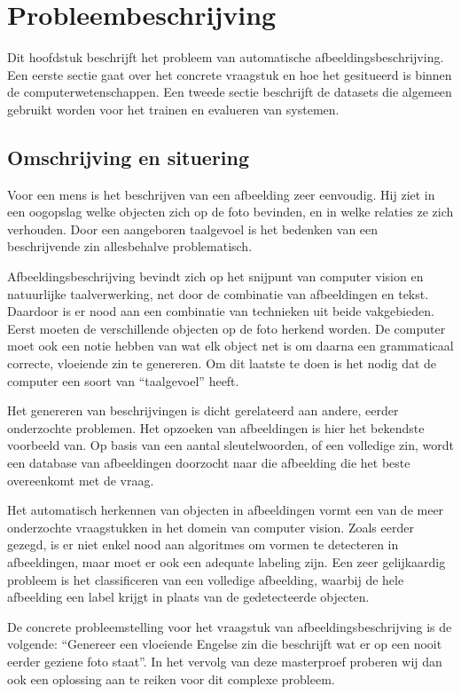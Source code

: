 \chapter{Probleembeschrijving}
\label{chap:Probleembeschrijving}

Dit hoofdstuk beschrijft het probleem van automatische afbeeldingsbeschrijving. Een eerste sectie gaat over het concrete vraagstuk en hoe het gesitueerd is binnen de computerwetenschappen. Een tweede sectie beschrijft de datasets die algemeen gebruikt worden voor het trainen en evalueren van systemen.

\section{Omschrijving en situering}
\label{sec:Omschrijving en situering}
Voor een mens is het beschrijven van een afbeelding zeer eenvoudig. Hij ziet in een oogopslag welke objecten zich op de foto bevinden, en in welke relaties ze zich verhouden. Door een aangeboren taalgevoel is het bedenken van een beschrijvende zin allesbehalve problematisch.

Afbeeldingsbeschrijving bevindt zich op het snijpunt van computer vision en natuurlijke taalverwerking, net door de combinatie van afbeeldingen en tekst. Daardoor is er nood aan een combinatie van technieken uit beide vakgebieden. Eerst moeten de verschillende objecten op de foto herkend worden. De computer moet ook een notie hebben van wat elk object net is om daarna een grammaticaal correcte, vloeiende zin te genereren. Om dit laatste te doen is het nodig dat de computer een soort van ``taalgevoel'' heeft.

Het genereren van beschrijvingen is dicht gerelateerd aan andere, eerder onderzochte problemen. Het opzoeken van afbeeldingen is hier het bekendste voorbeeld van. Op basis van een aantal sleutelwoorden, of een volledige zin, wordt een database van afbeeldingen doorzocht naar die afbeelding die het beste overeenkomt met de vraag.

Het automatisch herkennen van objecten in afbeeldingen vormt een van de meer onderzochte vraagstukken in het domein van computer vision. Zoals eerder gezegd, is er niet enkel nood aan algoritmes om vormen te detecteren in afbeeldingen, maar moet er ook een adequate labeling zijn. Een zeer gelijkaardig probleem is het classificeren van een volledige afbeelding, waarbij de hele afbeelding een label krijgt in plaats van de gedetecteerde objecten.

De concrete probleemstelling voor het vraagstuk van afbeeldingsbeschrijving is de volgende: ``Genereer een vloeiende Engelse zin die beschrijft wat er op een nooit eerder geziene foto staat''. In het vervolg van deze masterproef proberen wij dan ook een oplossing aan te reiken voor dit complexe probleem.

